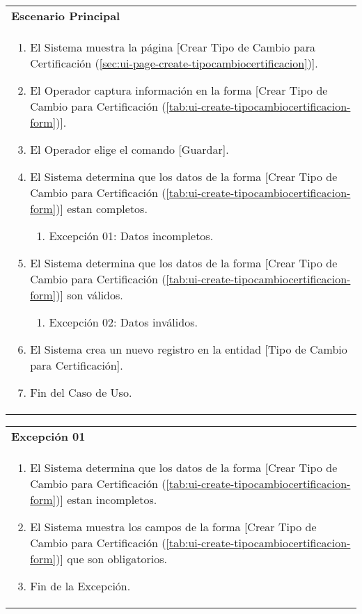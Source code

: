 \begin{tabular}{ p{15.5cm} }
	\textbf{Escenario Principal} \\
	\begin{enumerate}
		\item El Sistema muestra la página [Crear Tipo de Cambio para Certificación (\ref{sec:ui-page-create-tipocambiocertificacion})].
		\item El Operador captura información en la forma [Crear Tipo de Cambio para Certificación (\ref{tab:ui-create-tipocambiocertificacion-form})].
		\item El Operador elige el comando [Guardar].
		\item El Sistema determina que los datos de la forma [Crear Tipo de Cambio para Certificación (\ref{tab:ui-create-tipocambiocertificacion-form})] estan completos.
			\begin{enumerate}
				\item Excepción 01: Datos incompletos.
			\end{enumerate}
		\item El Sistema determina que los datos de la forma [Crear Tipo de Cambio para Certificación (\ref{tab:ui-create-tipocambiocertificacion-form})] son válidos.
			\begin{enumerate}
				\item Excepción 02: Datos inválidos.
			\end{enumerate}
		\item El Sistema crea un nuevo registro en la entidad [Tipo de Cambio para Certificación].
		\item Fin del Caso de Uso.
	\end{enumerate}
\end{tabular}

\begin{tabular}{ p{15.5cm} }
	\textbf{Excepción 01} \\
	\begin{enumerate}
		\item El Sistema determina que los datos de la forma [Crear Tipo de Cambio para Certificación (\ref{tab:ui-create-tipocambiocertificacion-form})] estan incompletos.
		\item El Sistema muestra los campos de la forma [Crear Tipo de Cambio para Certificación (\ref{tab:ui-create-tipocambiocertificacion-form})] que son obligatorios.
		\item Fin de la Excepción.
	\end{enumerate}
\end{tabular}

